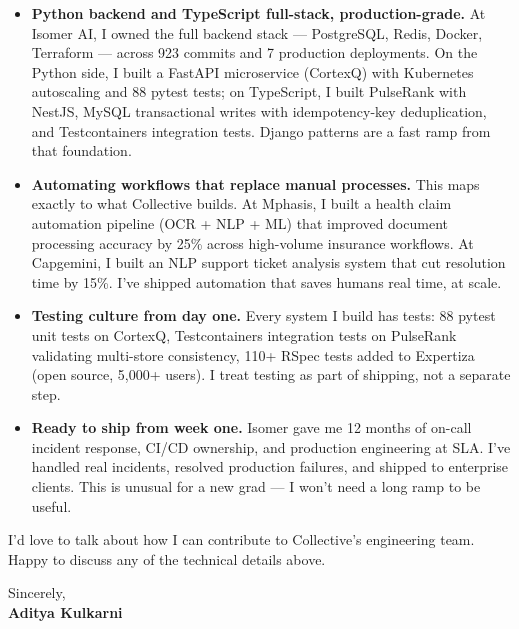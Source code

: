 \documentclass[11pt]{article}
\begin{document}
\begin{itemize}[leftmargin=1.2em, itemsep=4pt]
  \item[\textcolor{CollectivePurple}{\faAngleRight}] \textbf{Python backend and TypeScript full-stack, production-grade.} At Isomer AI, I owned the full backend stack — PostgreSQL, Redis, Docker, Terraform — across 923 commits and 7 production deployments. On the Python side, I built a FastAPI microservice (CortexQ) with Kubernetes autoscaling and 88 pytest tests; on TypeScript, I built PulseRank with NestJS, MySQL transactional writes with idempotency-key deduplication, and Testcontainers integration tests. Django patterns are a fast ramp from that foundation.
  \item[\textcolor{CollectivePurple}{\faAngleRight}] \textbf{Automating workflows that replace manual processes.} This maps exactly to what Collective builds. At Mphasis, I built a health claim automation pipeline (OCR + NLP + ML) that improved document processing accuracy by 25\% across high-volume insurance workflows. At Capgemini, I built an NLP support ticket analysis system that cut resolution time by 15\%. I've shipped automation that saves humans real time, at scale.
  \item[\textcolor{CollectivePurple}{\faAngleRight}] \textbf{Testing culture from day one.} Every system I build has tests: 88 pytest unit tests on CortexQ, Testcontainers integration tests on PulseRank validating multi-store consistency, 110+ RSpec tests added to Expertiza (open source, 5,000+ users). I treat testing as part of shipping, not a separate step.
  \item[\textcolor{CollectivePurple}{\faAngleRight}] \textbf{Ready to ship from week one.} Isomer gave me 12 months of on-call incident response, CI/CD ownership, and production engineering at SLA. I've handled real incidents, resolved production failures, and shipped to enterprise clients. This is unusual for a new grad — I won't need a long ramp to be useful.
\end{itemize}

\vspace{8pt}

I'd love to talk about how I can contribute to Collective's engineering team. Happy to discuss any of the technical details above.

\vspace{10pt}

Sincerely, \\[4pt]
\textbf{Aditya Kulkarni}
\end{document}
